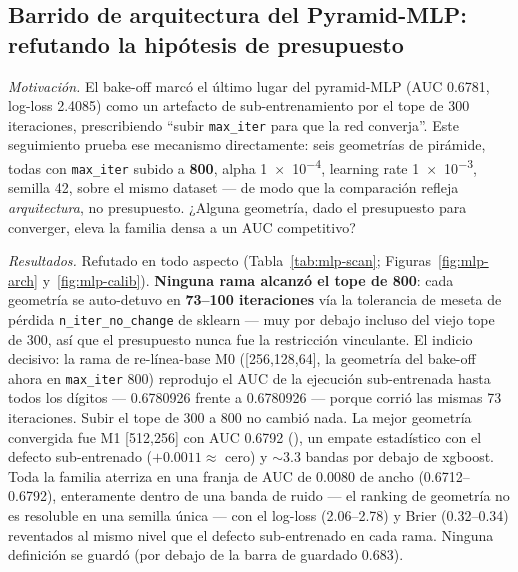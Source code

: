 \documentclass[11pt]{article}
\newcommand{\runid}[1]{\texttt{\small\seqsplit{#1}}}
\begin{document}
\subsection{Barrido de arquitectura del Pyramid-MLP: refutando la hipótesis de presupuesto}
\label{sec:mlp-scan}
\emph{Motivación.} El bake-off marcó el último lugar del pyramid-MLP (AUC
\num{0.6781}, log-loss \num{2.4085}) como un artefacto de sub-entrenamiento por
el tope de 300 iteraciones, prescribiendo ``subir \texttt{max\_iter} para que la
red converja''. Este seguimiento prueba ese mecanismo directamente: seis
geometrías de pirámide, todas con \texttt{max\_iter} subido a \textbf{800}, alpha
\num{1e-4}, learning rate \num{1e-3}, semilla 42, sobre el mismo dataset --- de
modo que la comparación refleja \emph{arquitectura}, no presupuesto. ¿Alguna
geometría, dado el presupuesto para converger, eleva la familia densa a un AUC
competitivo?

\emph{Resultados.} Refutado en todo aspecto (Tabla~\ref{tab:mlp-scan};
Figuras~\ref{fig:mlp-arch} y~\ref{fig:mlp-calib}). \textbf{Ninguna rama alcanzó el
tope de 800}: cada geometría se auto-detuvo en \textbf{73--100 iteraciones} vía
la tolerancia de meseta de pérdida \texttt{n\_iter\_no\_change} de sklearn --- muy
por debajo incluso del viejo tope de 300, así que el presupuesto nunca fue la
restricción vinculante. El indicio decisivo: la rama de re-línea-base M0
([256,128,64], la geometría del bake-off ahora en \texttt{max\_iter} 800)
reprodujo el AUC de la ejecución sub-entrenada hasta todos los dígitos ---
\num{0.6780926} frente a \num{0.6780926} --- porque corrió las mismas 73
iteraciones. Subir el tope de 300 a 800 no cambió nada. La mejor geometría
convergida fue M1 [512,256] con AUC \num{0.6792}
(\runid{run-20260612-123155-0ace5}), un empate estadístico con el defecto
sub-entrenado ($+0.0011 \approx$ cero) y $\sim$3.3 bandas por debajo de xgboost.
Toda la familia aterriza en una franja de AUC de 0.0080 de ancho
(0.6712--0.6792), enteramente dentro de una banda de ruido --- el ranking de
geometría no es resoluble en una semilla única --- con el log-loss (2.06--2.78) y
Brier (0.32--0.34) reventados al mismo nivel que el defecto sub-entrenado en cada
rama. Ninguna definición se guardó (por debajo de la barra de guardado 0.683).
\end{document}
